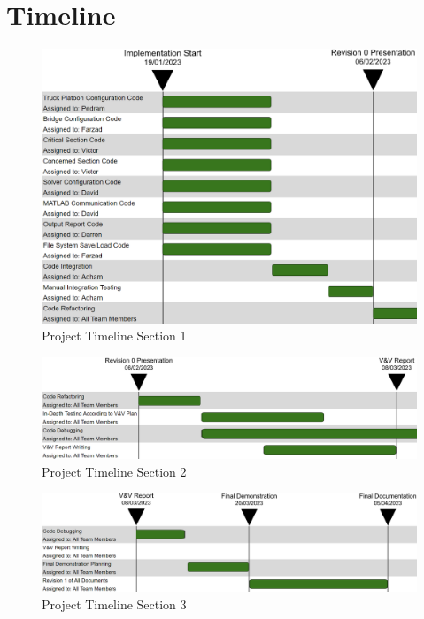 \documentclass[12pt, titlepage]{article}
\begin{document}
\section{Timeline}

\begin{figure}[H]
  \centering
  \includegraphics[scale=0.7]{../images/Timeline1.PNG}
  \caption{Project Timeline Section 1}
  \label{fig:timeline1}
\end{figure}

\begin{landscape}
\newpage

\begin{figure}[H]
  \centering
  \includegraphics[scale=0.65]{../images/Timeline2.PNG}
  \caption{Project Timeline Section 2}
  \label{fig:timeline2}
\end{figure}

\begin{figure}[H]
  \centering
  \includegraphics[scale=0.65]{../images/Timeline3.PNG}
  \caption{Project Timeline Section 3}
  \label{fig:timeline3}
\end{figure}

\end{landscape}
\end{document}
